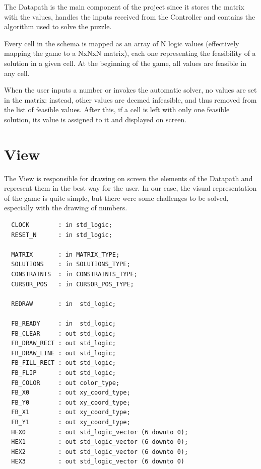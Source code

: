 \documentclass[12pt]{report}
\begin{document}
The Datapath is the main component of the project since it stores the
matrix with the values, handles the inputs received from the Controller
and contains the algorithm used to solve the puzzle.

Every cell in the schema is mapped as an array of N logic values (effectively
mapping the game to a NxNxN matrix), each one representing the feasibility
of a solution in a given cell. At the beginning of the game, all values
are feasible in any cell.

When the user inputs a number or invokes the automatic solver, no values are
set in the matrix: instead, other values are deemed infeasible, and thus
removed from the list of feasible values. After this, if a cell is left
with only one feasible solution, its value is assigned to it and displayed
on screen.

\newpage

\section*{View}

The View is responsible for drawing on screen the elements of the Datapath
and represent them in the best way for the user. In our case, the visual
representation of the game is quite simple, but there were some challenges
to be solved, especially with the drawing of numbers.

\begin{center}
\begin{minipage}{0.5\textwidth}
\begin{verbatim}
  CLOCK        : in std_logic;
  RESET_N      : in std_logic;

  MATRIX       : in MATRIX_TYPE;
  SOLUTIONS    : in SOLUTIONS_TYPE;
  CONSTRAINTS  : in CONSTRAINTS_TYPE;
  CURSOR_POS   : in CURSOR_POS_TYPE;

  REDRAW       : in  std_logic;

  FB_READY     : in  std_logic;
  FB_CLEAR     : out std_logic;
  FB_DRAW_RECT : out std_logic;
  FB_DRAW_LINE : out std_logic;
  FB_FILL_RECT : out std_logic;
  FB_FLIP      : out std_logic;
  FB_COLOR     : out color_type;
  FB_X0        : out xy_coord_type;
  FB_Y0        : out xy_coord_type;
  FB_X1        : out xy_coord_type;
  FB_Y1        : out xy_coord_type;
  HEX0         : out std_logic_vector (6 downto 0);
  HEX1         : out std_logic_vector (6 downto 0);
  HEX2         : out std_logic_vector (6 downto 0);
  HEX3         : out std_logic_vector (6 downto 0)
\end{verbatim}
\end{minipage}
\end{center}
\end{document}
